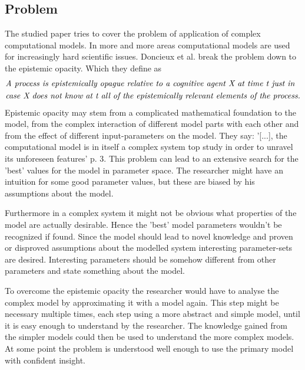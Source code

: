 \documentclass[12pt,twoside]{article}
\theoremstyle{plain}
\theoremstyle{definition}
\theoremstyle{remark}
\begin{document}
\subsection{Problem}
The studied paper \cite{doncieux2015multi} tries to cover the problem of application of complex computational models.
In more and more areas computational models are used for increasingly hard scientific issues.
Doncieux et al. break the problem down to the epistemic opacity. Which they define as
\begin{align*}
	&\text{\textit{A process is epistemically opague relative to a cognitive agent X at time t just in}}\\
	&\text{\textit{case X does not know at t all of the epistemically relevant elements of the process.}}
\end{align*}
Epistemic opacity may stem from a complicated mathematical foundation to the model, from the complex interaction of different model parts with each other and from the effect of different input-parameters on the model.
They say: '[...], the computational model is in itself a complex system top study in order to unravel its unforeseen features' \cite{doncieux2015multi} p. 3.
This problem can lead to an extensive search for the 'best' values for the model in parameter space.
The researcher might have an intuition for some good parameter values, but these are biased by his assumptions about the model. 

Furthermore in a complex system it might not be obvious what properties of the model are actually desirable. Hence the 'best' model parameters wouldn't be recognized if found.
Since the model should lead to novel knowledge and proven or disproved assumptions about the modelled system interesting parameter-sets are desired. Interesting parameters should be somehow different from other parameters and state something about the model.

To overcome the epistemic opacity the researcher would have to analyse the complex model by approximating it with a model again. This step might be necessary multiple times, each step using a more abstract and simple model, until it is easy enough to understand by the researcher. The knowledge gained from the simpler models could then be used to understand the more complex models. At some point the problem is understood well enough to use the primary model with confident insight.
\end{document}
